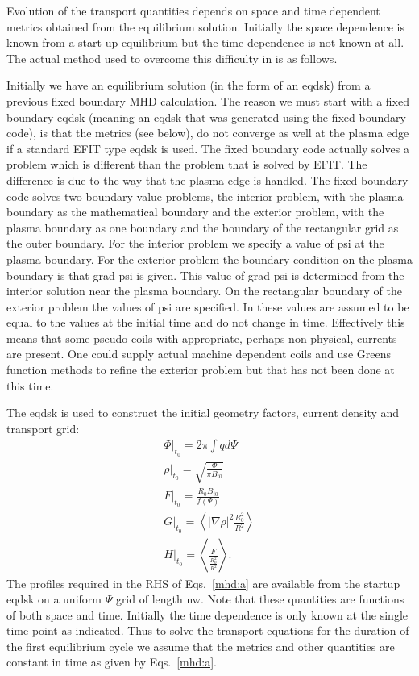 Evolution of the transport quantities depends on space and time dependent
metrics obtained from the equilibrium solution. Initially the space dependence
is known from a start up equilibrium but the time dependence is not known at
all. The actual method used to overcome this difficulty in \ot is as follows.

Initially we have an equilibrium solution (in the form of an eqdsk) from a
previous fixed boundary MHD calculation. The reason we must start with a fixed
boundary eqdsk (meaning an eqdsk that was generated using the fixed boundary
code), is that the metrics (see below), do not converge as well at the plasma
edge  if a standard EFIT type eqdsk is used. The fixed boundary code actually
solves a problem which is different than the problem that is solved by EFIT. The
difference is due to the way that the plasma edge is handled. The fixed boundary
code solves two boundary value problems, the interior problem, with the plasma
boundary as the mathematical boundary and the exterior problem, with the plasma
boundary as one boundary and the boundary of the rectangular grid as the outer
boundary. For the interior problem we specify a value of psi at the plasma
boundary. For the exterior problem the boundary condition on the plasma boundary
is that grad psi is given. This value of grad psi is determined from the
interior solution near the plasma boundary. On the rectangular boundary of the
exterior problem the values of psi are specified. In \ot these values are
assumed to be equal to the values at the initial time and do not change in time.
Effectively this means that some pseudo  coils with appropriate, perhaps non
physical, currents are present. One could supply actual machine dependent coils
and use Greens function methods to refine the exterior  problem but that has not
been done at this time.



The  eqdsk is used to construct the initial geometry factors, current density
and transport grid:
\begin{subequations}\label{mhd:a}
 \begin{gather}
  \Phi\vert_{t_0}  = 2\pi\int q d\Psi \label{mhd:a1} \\
  \rho\vert_{t_0}  = \sqrt{\frac{\Phi}{\pi B_{t0}}}   \\
  F\vert_{t_0} = \frac{R_0 B_{t0}}{f(\Psi)}  \\
  G\vert_{t_0} =  \left\langle
   \vert\nabla\rho\vert^2\frac{R_0^2}{R^2}\right\rangle \\
  H\vert_{t_0} =  \left\langle \frac{F}{\frac{R_0^2}{R^2}}\right\rangle .
 \end{gather}
\end{subequations}
The profiles required in the RHS of Eqs.~\eqref{mhd:a} are  available from the
startup eqdsk on a uniform $\Psi$ grid of length nw. Note that these quantities
are functions of both space and time. Initially the time dependence is only
known at the single  time point as indicated. Thus to solve the transport
equations for the duration of the first equilibrium cycle we assume that the
metrics and other quantities are constant in time as given by
Eqs.~\eqref{mhd:a}.

